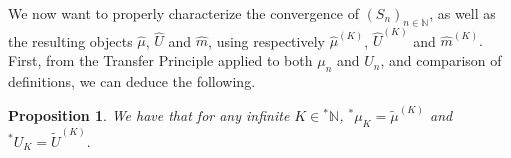\documentclass[10pt,a4paper]{amsart}
\newtheorem{thm}{Theorem}[section]
\newtheorem{prop}[thm]{Proposition}
\def \Dom{\operatorname{dom}}
\def \St{\operatorname{st}}
\def \Borel{\operatorname{Borel}}
\def \HOM{\hat{\Omega}}
\def \HMU{\hat{\mu}}
\def \HNU{\hat{\nu}}
\def \HU{\hat{U}}
\def \Hm{\hat{m}}
\begin{document}
%	
%	
%	


We now want to properly characterize the convergence of $(S_n)_{n\in\mathbb{N}}$, as well as the resulting objects $\HMU$, $\HU$ and $\Hm$, using respectively $\HMU^{(K)}$, $\HU^{(K)}$ and $\Hm^{(K)}.$ First, from the Transfer Principle applied to both $\mu_n$ and $U_n$, and comparison of definitions, we can deduce the following.

\begin{prop}
	We have that for any infinite $K\in{}^*\mathbb{N}$, ${}^*\mu_K=\tilde{\mu}^{(K)}$ and ${}^*U_K=\tilde{U}^{(K)}.$
\end{prop}
\end{document}
